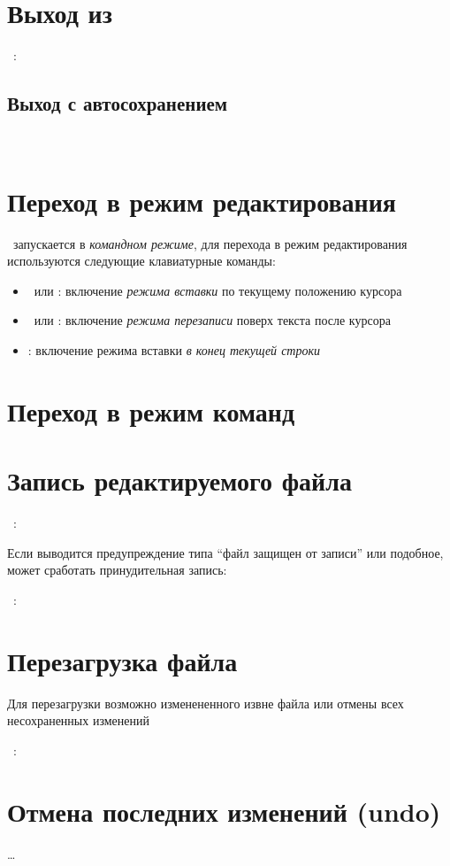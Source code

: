 \section{Выход из \vim}

\ :\ \keys{!}\ \ 

\subsection{Выход с автосохранением}

\ \ 

\section{Переход в режим редактирования}

\vim\ запускается в \emph{командном режиме}, для перехода в режим редактирования
используются следующие клавиатурные команды:

\begin{itemize}
  \item {}\ или : включение \emph{режима вставки} по текущему
  положению курсора
  \item {}\ или : включение \emph{режима перезаписи}
  поверх текста после курсора
  \item {}: включение режима вставки \emph{в конец текущей строки}
\end{itemize}

\section{Переход в режим команд}


\section{Запись редактируемого файла}

\ :\ \ 
\bigskip

Если выводится предупреждение типа ``файл защищен от записи'' или подобное,
может сработать принудительная запись:

\bigskip
{}\ :\ \keys{!}\ \ 

\section{Перезагрузка файла}

Для перезагрузки возможно изменененного извне файла или отмены всех
несохраненных изменений

\bigskip
{}\ :\ \ 

\section{Отмена последних изменений (undo)}

\ldots
